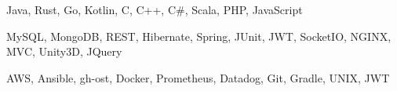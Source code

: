 
\begin{cvskills}

   {Java, Rust, Go, Kotlin, C, C++, C\#, Scala, PHP,
    JavaScript}

   {MySQL, MongoDB, REST, Hibernate, Spring, JUnit, JWT,
    SocketIO, NGINX, MVC, Unity3D, JQuery}

   {AWS, Ansible, gh-ost, Docker, Prometheus, Datadog, Git,
    Gradle, UNIX, JWT}

\end{cvskills}

